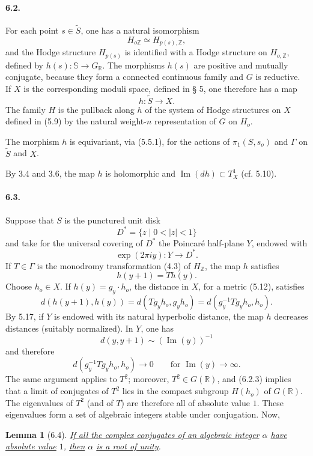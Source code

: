 \documentclass[10pt,leqno]{article}
\newcommand{\R}{\mathbb R}
\newcommand{\Z}{\mathbb Z}
\newcommand{\bS}{\mathbb S}
\theoremstyle{deligne}
\newtheorem*{lemma}{Lemma}
\renewcommand{\underline}[1]{\uline{#1}}
\begin{document}
\paragraph{6.2.}
For each point $s\in\widetilde S$, one has a natural isomorphism
\[
  H_{o\Z}\simeq H_{p(s),\Z},
\]
and the Hodge structure $H_{p(s)}$ is identified with a Hodge structure on $H_{o,\Z}$, defined by $h(s):\bS\to G_\R$. The morphisms $h(s)$ are positive and mutually conjugate, because they form a connected continuous family and $G$ is reductive. If $X$ is the corresponding moduli space, defined in § 5, one therefore has a map
\[
  h:\widetilde S\longrightarrow X.
\]
The family $H$ is the pullback along $h$ of the system of Hodge structures on $X$ defined in (5.9) by the natural weight-$n$ representation of $G$ on $H_o$.

The morphism $h$ is equivariant, via (5.5.1), for the actions of $\pi_1(S,s_o)$ and $\Gamma$ on $\widetilde S$ and $X$.

By 3.4 and 3.6, the map $h$ is holomorphic and $\operatorname{Im}(dh)\subset T_X^1$ (cf. 5.10).

\paragraph{6.3.}
Suppose that $S$ is the punctured unit disk
\[
  D^*=\{z\mid 0<|z|<1\}
\]
and take for the universal covering of $D^*$ the Poincaré half-plane $Y$, endowed with
\[
  \exp(2\pi i y):Y\longrightarrow D^*.
\]
If $T\in\Gamma$ is the monodromy transformation (4.3) of $H_\Z$, the map $h$ satisfies
\[
\tag{6.3.1}
  h(y+1)=T h(y).
\]
Choose $h_o\in X$. If $h(y)=g_y\cdot h_o$, the distance in $X$, for a metric (5.12), satisfies
\[
\tag{6.3.2}
  d(h(y+1),h(y))=d(Tg_yh_o,g_yh_o)=d(g_y^{-1}Tg_yh_o,h_o).
\]
By 5.17, if $Y$ is endowed with its natural hyperbolic distance, the map $h$ decreases distances (suitably normalized). In $Y$, one has
\[
  d(y,y+1)\sim (\operatorname{Im}(y))^{-1}
\]
and therefore
\[
\tag{6.3.3}
  d(g_y^{-1}Tg_yh_o,h_o)\longrightarrow 0\qquad\text{for }\operatorname{Im}(y)\to\infty .
\]
The same argument applies to $T^2$; moreover, $T^2\in G(\R)$, and (6.2.3) implies that a limit of conjugates of $T^2$ lies in the compact subgroup $H(h_o)$ of $G(\R)$. The eigenvalues of $T^2$ (and of $T$) are therefore all of absolute value $1$.
These eigenvalues form a set of algebraic integers stable under conjugation. Now,

\begin{lemma}[6.4]
\underline{If all the complex conjugates of an algebraic integer} $\alpha$ \underline{have absolute value} $1$, \underline{then} $\alpha$ \underline{is a root of unity}.
\end{lemma}
\end{document}
